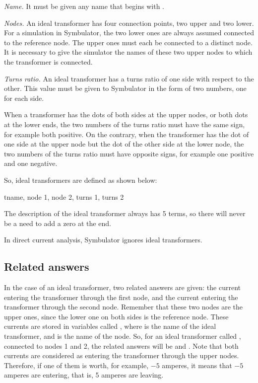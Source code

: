 \emph{Name.} It must be given any name that begins with .

\emph{Nodes.} An ideal transformer has four connection points, two
upper and two lower. For a simulation in Symbulator, the two lower
ones are always assumed connected to the reference node. The upper
ones must each be connected to a distinct node. It is necessary to
give the simulator the names of these two upper nodes to which the
transformer is connected.

\emph{Turns ratio.} An ideal transformer has a turns ratio of one
side with respect to the other. This value must be given to
Symbulator in the form of two numbers, one for each side.

When a transformer has the dots of both sides at the upper nodes, or
both dots at the lower ends, the two numbers of the turns ratio must
have the same sign, for example both positive. On the contrary, when
the transformer has the dot of one side at the upper node but the
dot of the other side at the lower node, the two numbers of the
turns ratio must have opposite signs, for example one positive and
one negative.

So, ideal transformers are defined as shown below:

\begin{entry}
tname, node 1, node 2, turns 1, turns 2
\end{entry}

The description of the ideal transformer always has 5 terms, so
there will never be a need to add a zero at the end.

In direct current analysis, Symbulator ignores ideal transformers.

\subsection{Related answers}

In the case of an ideal transformer, two related answers are given:
the current entering the transformer through the first node, and the
current entering the transformer through the second node. Remember
that these two nodes are the upper ones, since the lower one on both
sides is the reference node. These currents are stored in variables
called , where  is the name of the ideal
transformer, and  is the name of the node. So, for an
ideal transformer called , connected to nodes 1 and 2, the
related answers will be  and . Note that both
currents are considered as entering the transformer through the
upper nodes. Therefore, if one of them is worth, for example, $-5$
amperes, it means that $-5$ amperes are entering, that is, 5 amperes
are leaving.

